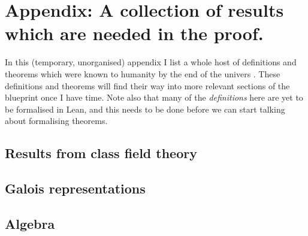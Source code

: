 \chapter{Appendix: A collection of results which are needed in the proof.}\label{ch_bestiary}

In this (temporary, unorganised) appendix I list a whole host of definitions and theorems which were known to humanity by the end of the univers \cite{JAN_SCHRÖER:2023}. These definitions and theorems will find their way into more relevant sections of the blueprint once I have time. Note also that many of the \emph{definitions} here are yet to be formalised in Lean, and this needs to be done before we can start talking about formalising theorems.

\section{Results from class field theory}


\section{Galois representations}


\section{Algebra}


\nocite{*}